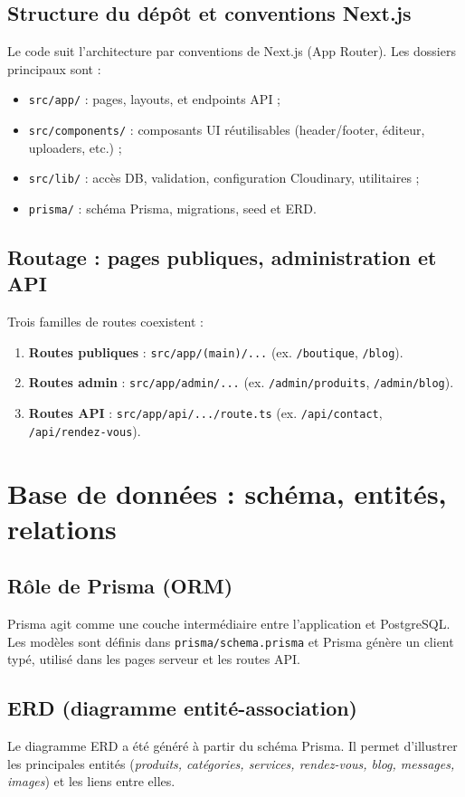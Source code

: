 \subsection{Structure du dépôt et conventions Next.js}
Le code suit l’architecture par conventions de Next.js (App Router). Les dossiers principaux sont :
\begin{itemize}
    \item \texttt{src/app/} : pages, layouts, et endpoints API ;
    \item \texttt{src/components/} : composants UI réutilisables (header/footer, éditeur, uploaders, etc.) ;
    \item \texttt{src/lib/} : accès DB, validation, configuration Cloudinary, utilitaires ;
    \item \texttt{prisma/} : schéma Prisma, migrations, seed et ERD.
\end{itemize}

\subsection{Routage : pages publiques, administration et API}
Trois familles de routes coexistent :
\begin{enumerate}
    \item \textbf{Routes publiques} : \texttt{src/app/(main)/...} (ex. \texttt{/boutique}, \texttt{/blog}).
    \item \textbf{Routes admin} : \texttt{src/app/admin/...} (ex. \texttt{/admin/produits}, \texttt{/admin/blog}).
    \item \textbf{Routes API} : \texttt{src/app/api/.../route.ts} (ex. \texttt{/api/contact}, \texttt{/api/rendez-vous}).
\end{enumerate}

\section{Base de données : schéma, entités, relations}

\subsection{Rôle de Prisma (ORM)}
Prisma agit comme une couche intermédiaire entre l’application et PostgreSQL. Les modèles sont définis dans \texttt{prisma/schema.prisma} et Prisma génère un client typé, utilisé dans les pages serveur et les routes API.

\subsection{ERD (diagramme entité-association)}
Le diagramme ERD a été généré à partir du schéma Prisma. Il permet d’illustrer les principales entités (\textit{produits, catégories, services, rendez-vous, blog, messages, images}) et les liens entre elles.

